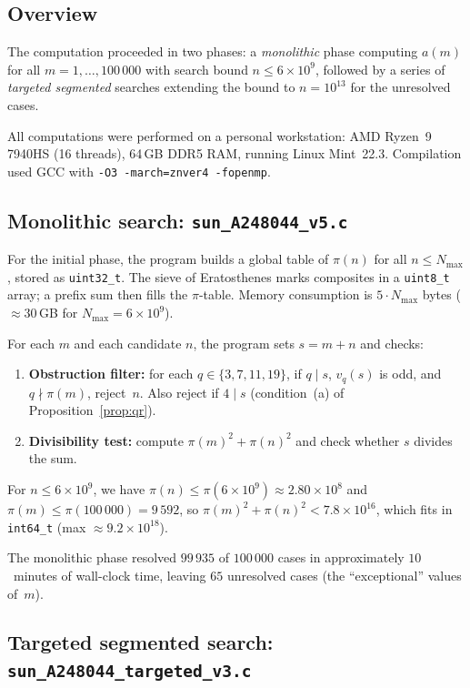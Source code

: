 \documentclass{amsart}
\theoremstyle{definition}
\theoremstyle{remark}
\numberwithin{equation}{section}
\newcommand{\vq}[1]{v_{#1}}
\begin{document}
\subsection{Overview}

The computation proceeded in two phases:
a \emph{monolithic} phase computing $a(m)$ for all
$m = 1, \ldots, 100\,000$ with search bound $n \le 6 \times 10^9$,
followed by a series of \emph{targeted segmented} searches
extending the bound to $n = 10^{13}$ for the unresolved cases.

All computations were performed on a personal workstation:
AMD Ryzen~9 7940HS (16 threads), 64\,GB DDR5 RAM,
running Linux Mint~22.3.  Compilation used GCC with
\texttt{-O3 -march=znver4 -fopenmp}.

\subsection{Monolithic search: \texttt{sun\_A248044\_v5.c}}

For the initial phase, the program builds a global table of
$\pi(n)$ for all $n \le N_{\max}$, stored as \texttt{uint32\_t}.
The sieve of Eratosthenes marks composites in a
\texttt{uint8\_t} array; a prefix sum then fills the $\pi$-table.
Memory consumption is $5 \cdot N_{\max}$ bytes
($\approx 30$\,GB for $N_{\max} = 6 \times 10^9$).

For each $m$ and each candidate $n$, the program sets
$s = m + n$ and checks:
\begin{enumerate}
\item \textbf{Obstruction filter:}
  for each $q \in \{3, 7, 11, 19\}$, if $q \mid s$, $\vq{q}(s)$
  is odd, and $q \nmid \pi(m)$, reject~$n$.
  Also reject if $4 \mid s$ (condition~(a) of
  Proposition~\ref{prop:qr}).
\item \textbf{Divisibility test:}
  compute $\pi(m)^2 + \pi(n)^2$ and check whether $s$ divides the
  sum.
\end{enumerate}

For $n \le 6 \times 10^9$, we have $\pi(n) \le \pi(6 \times 10^9)
\approx 2.80 \times 10^8$ and $\pi(m) \le \pi(100\,000)
= 9\,592$, so $\pi(m)^2 + \pi(n)^2 < 7.8 \times 10^{16}$, which
fits in \texttt{int64\_t} (max $\approx 9.2 \times 10^{18}$).

The monolithic phase resolved $99\,935$ of $100\,000$ cases in
approximately $10$~minutes of wall-clock time, leaving $65$
unresolved cases (the ``exceptional'' values of~$m$).

\subsection{Targeted segmented search: \texttt{sun\_A248044\_targeted\_v3.c}}
\label{sec:targeted}
\end{document}

